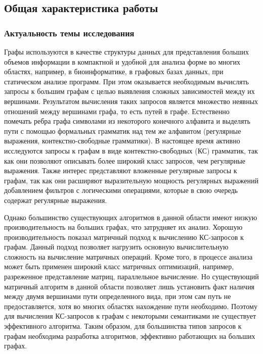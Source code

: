 \subsection*{\Large Общая характеристика работы}
\fontsize{14pt}{15pt}\selectfont
\subsubsection*{\large{Актуальность темы исследования}}
Графы используются в качестве структуры данных для представления больших объемов информации в компактной и удобной для анализа форме во многих областях, например, в биоинформатике, в графовых базах данных, при статическом анализе программ. При этом оказывается необходимым вычислять запросы к большим графам с целью выявления сложных зависимостей между их вершинами. Результатом вычисления таких запросов является множество неявных отношений между вершинами графа, то есть путей в графе. Естественно помечать ребра графа символами из некоторого конечного алфавита и выделять пути с помощью формальных грамматик над тем же алфавитом (регулярные выражения, контекстно-свободные грамматики). В настоящее время активно исследуются запросы к графам в виде контекстно-свободных (КС) грамматик, так как они позволяют описывать более широкий класс запросов, чем регулярные выражения. Также интерес представляют вложенные регулярные запросы к графам, так как они расширяют выразительную мощность регулярных выражений добавлением фильтров с логическими операциями, которые в свою очередь содержат регулярные выражения.

Однако большинство существующих алгоритмов в данной области имеют низкую производительность на больших графах, что затрудняет их анализ. Хорошую производительность показал матричный подход к вычислению КС-запросов к графам. Данный подход позволяет нагрузить основную вычислительную сложность на вычисление матричных операций. Кроме того, в процессе анализа может быть применен широкий класс матричных оптимизаций, например, разреженное представление матриц, параллельное вычисление. Но существующий матричный алгоритм в данной области позволяет лишь установить факт наличия между двумя вершинами пути определенного вида, при этом сам путь не предоставляется, хотя во многих областях нахождение пути необходимо. Поэтому для вычисления КС-запросов к графам с некоторыми семантиками не существует эффективного алгоритма. Таким образом, для большинства типов запросов к графам необходима разработка алгоритмов, эффективно работающих на больших графах.



